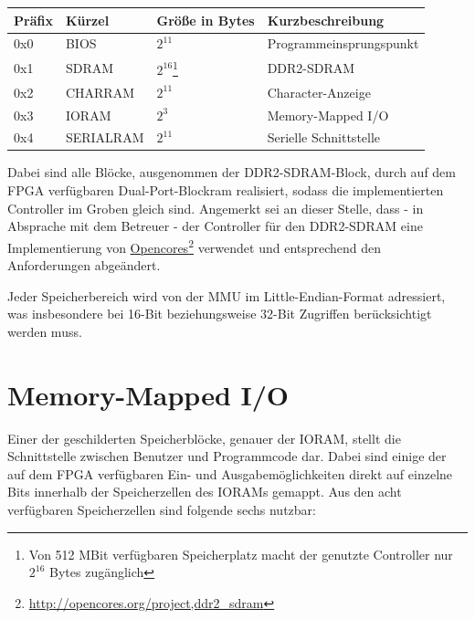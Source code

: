 \begin{center}
	\begin{tabular}{| l | l | l | l |}
		\hline
		Pr\"afix & K\"urzel & Gr\"o\ss{}e in Bytes & Kurzbeschreibung \\ \hline
		0x0 & BIOS & $2^{11}$ & Programmeinsprungspunkt \\ \hline
		0x1 & SDRAM & $2^{16}$\footnote{Von 512 MBit verf\"ugbaren Speicherplatz macht der genutzte Controller nur $2^{16}$ Bytes zug\"anglich} & DDR2-SDRAM \\ \hline
		0x2 & CHARRAM & $2^{11}$ & Character-Anzeige \\ \hline
		0x3 & IORAM & $2^{3}$ & Memory-Mapped I/O \\ \hline
		0x4 & SERIALRAM & $2^{11}$ & Serielle Schnittstelle \\ \hline
	\end{tabular}
\end{center}

Dabei sind alle Bl\"ocke, ausgenommen der DDR2-SDRAM-Block, durch auf dem FPGA verf\"ugbaren Dual-Port-Blockram realisiert, sodass die implementierten Controller im Groben gleich sind. Angemerkt sei an dieser Stelle, dass - in Absprache mit dem Betreuer - der Controller f\"ur den DDR2-SDRAM eine Implementierung von \href{http://opencores.org/project,ddr2_sdram}{Opencores}\footnote{\url{http://opencores.org/project,ddr2_sdram}} verwendet und entsprechend den Anforderungen abge\"andert.

Jeder Speicherbereich wird von der MMU im Little-Endian-Format adressiert, was insbesondere bei 16-Bit beziehungsweise 32-Bit Zugriffen ber\"ucksichtigt werden muss.

\section{Memory-Mapped I/O}
\label{sec:mmuio}
Einer der geschilderten Speicherbl\"ocke, genauer der IORAM, stellt die Schnittstelle zwischen Benutzer und Programmcode dar. Dabei sind einige der auf dem FPGA verf\"ugbaren Ein- und Ausgabem\"oglichkeiten direkt auf einzelne Bits innerhalb der Speicherzellen des IORAMs gemappt. Aus den acht verf\"ugbaren Speicherzellen sind folgende sechs nutzbar:

